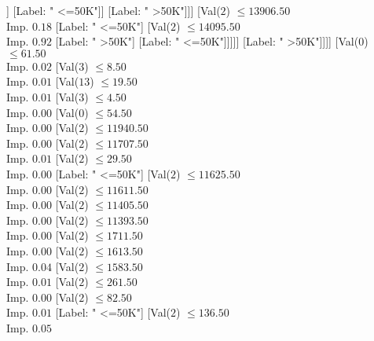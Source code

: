 \documentclass[margin=10pt]{standalone}
\begin{document}
\begin{forest}
												[Val($2$) $ \leq 4363.50$ \\ Imp. $0.22$
													[Label: " <=50K"]
													[Val($2$) $ \leq 7066.50$ \\ Imp. $0.14$
														[Val($2$) $ \leq 6061.50$ \\ Imp. $0.13$
															[Val($13$) $ \leq 30.50$ \\ Imp. $0.08$
																[Label: " >50K"]
																[Label: " <=50K"]]
															[Label: " <=50K"]]
														[Label: " >50K"]]]
												[Val($2$) $ \leq 13906.50$ \\ Imp. $0.18$
													[Label: " <=50K"]
													[Val($2$) $ \leq 14095.50$ \\ Imp. $0.92$
														[Label: " >50K"]
														[Label: " <=50K"]]]]]
										[Label: " >50K"]]]]
							[Val($0$) $ \leq 61.50$ \\ Imp. $0.02$
								[Val($3$) $ \leq 8.50$ \\ Imp. $0.01$
									[Val($13$) $ \leq 19.50$ \\ Imp. $0.01$
										[Val($3$) $ \leq 4.50$ \\ Imp. $0.00$
											[Val($0$) $ \leq 54.50$ \\ Imp. $0.00$
												[Val($2$) $ \leq 11940.50$ \\ Imp. $0.00$
													[Val($2$) $ \leq 11707.50$ \\ Imp. $0.01$
														[Val($2$) $ \leq 29.50$ \\ Imp. $0.00$
															[Label: " <=50K"]
															[Val($2$) $ \leq 11625.50$ \\ Imp. $0.00$
																[Val($2$) $ \leq 11611.50$ \\ Imp. $0.00$
																	[Val($2$) $ \leq 11405.50$ \\ Imp. $0.00$
																		[Val($2$) $ \leq 11393.50$ \\ Imp. $0.00$
																			[Val($2$) $ \leq 1711.50$ \\ Imp. $0.00$
																				[Val($2$) $ \leq 1613.50$ \\ Imp. $0.04$
																					[Val($2$) $ \leq 1583.50$ \\ Imp. $0.01$
																						[Val($2$) $ \leq 261.50$ \\ Imp. $0.00$
																							[Val($2$) $ \leq 82.50$ \\ Imp. $0.01$
																								[Label: " <=50K"]
																								[Val($2$) $ \leq 136.50$ \\ Imp. $0.05$

\end{forest}
\end{document}
